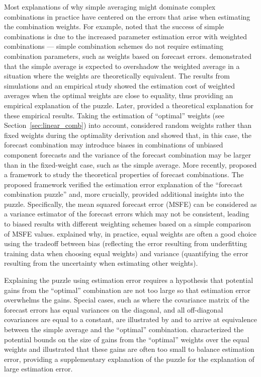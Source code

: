 \documentclass[a4paper,11pt]{article}
\begin{document}
Most explanations of why simple averaging might dominate complex combinations in practice have centered on the errors that arise when estimating the combination weights. For example, \citet{Timmermann2006-en} noted that the success of simple combinations is due to the increased parameter estimation error with weighted combinations --- simple combination schemes do not require estimating combination parameters, such as weights based on forecast errors. \citet{Smith2009-wd} demonstrated that the simple average is expected to overshadow the weighted average in a situation where the weights are theoretically equivalent. The results from simulations and an empirical study showed the estimation cost of weighted averages when the optimal weights are close to equality, thus providing an empirical explanation of the puzzle. Later, \citet{Claeskens2016-pv} provided a theoretical explanation for these empirical results. Taking the estimation of ``optimal'' weights (see Section~\ref{sec:linear_comb}) into account, \citet{Claeskens2016-pv} considered random weights rather than fixed weights during the optimality derivation and showed that, in this case, the forecast combination may introduce biases in combinations of unbiased component forecasts and the variance of the forecast combination may be larger than in the fixed-weight case, such as the simple average. More recently, \citet{Chan2018-jl} proposed a framework to study the theoretical properties of forecast combinations. The proposed framework verified the estimation error explanation of the ``forecast combination puzzle'' and, more crucially, provided additional insights into the puzzle. Specifically, the mean squared forecast error (MSFE) can be considered as a variance estimator of the forecast errors which may not be consistent, leading to biased results with different weighting schemes based on a simple comparison of MSFE values. \citet{Blanc2020-pg} explained why, in practice, equal weights are often a good choice using the tradeoff between bias (reflecting the error resulting from underfitting training data when choosing equal weights) and variance (quantifying the error resulting from the uncertainty when estimating other weights).

Explaining the puzzle using estimation error requires a hypothesis that potential gains from the ``optimal'' combination are not too large so that estimation error overwhelms the gains. Special cases, such as where the covariance matrix of the forecast errors has equal variances on the diagonal, and all off-diagonal covariances are equal to a constant, are illustrated by \citet{Timmermann2006-en} and \citet{Hsiao2014-ug} to arrive at equivalence between the simple average and the ``optimal'' combination. \citet{Elliott2011-ab} characterized the potential bounds on the size of gains from the ``optimal'' weights over the equal weights and illustrated that these gains are often too small to balance estimation error, providing a supplementary explanation of the puzzle for the explanation of large estimation error.
\end{document}
